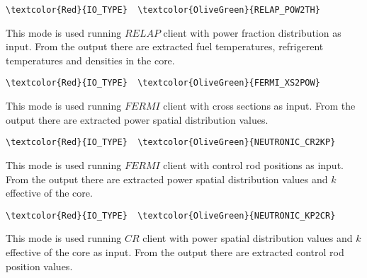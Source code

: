 \begin{Verbatim}[frame=single,commandchars=\\\{\}]
\textcolor{Red}{IO_TYPE}  \textcolor{OliveGreen}{RELAP_POW2TH}
\end{Verbatim}
This mode is used running $RELAP$ client with power fraction distribution as input. From the output there are extracted fuel temperatures, refrigerent temperatures and densities in the core.

\begin{Verbatim}[frame=single,commandchars=\\\{\}]
\textcolor{Red}{IO_TYPE}  \textcolor{OliveGreen}{FERMI_XS2POW}
\end{Verbatim}
This mode is used running $FERMI$ client with cross sections as input. From the output there are extracted power spatial distribution values.

\begin{Verbatim}[frame=single,commandchars=\\\{\}]
\textcolor{Red}{IO_TYPE}  \textcolor{OliveGreen}{NEUTRONIC_CR2KP}
\end{Verbatim}
This mode is used running $FERMI$ client with control rod positions as input. From the output there are extracted power spatial distribution values and $k$ effective of the core.

\begin{Verbatim}[frame=single,commandchars=\\\{\}]
\textcolor{Red}{IO_TYPE}  \textcolor{OliveGreen}{NEUTRONIC_KP2CR}
\end{Verbatim}
This mode is used running $CR$ client with power spatial distribution values and $k$ effective of the core as input. From the output there are extracted control rod position values.



